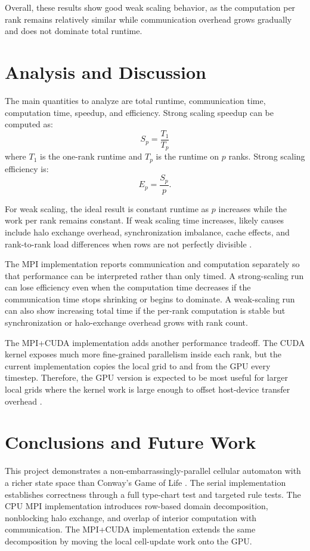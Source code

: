 \documentclass[10pt,twocolumn]{article}
\begin{document}
Overall, these results show good weak scaling behavior, as the computation per rank remains relatively similar while communication overhead grows gradually and does not dominate total runtime.

\FloatBarrier
\section*{Analysis and Discussion}

The main quantities to analyze are total runtime, communication time, computation time, speedup, and efficiency. Strong scaling speedup can be computed as:
\[
S_p = \frac{T_1}{T_p}
\]
where $T_1$ is the one-rank runtime and $T_p$ is the runtime on $p$ ranks. Strong scaling efficiency is:
\[
E_p = \frac{S_p}{p}.
\]

For weak scaling, the ideal result is constant runtime as $p$ increases while the work per rank remains constant. If weak scaling time increases, likely causes include halo exchange overhead, synchronization imbalance, cache effects, and rank-to-rank load differences when rows are not perfectly divisible \cite{halo, stencil}.

The MPI implementation reports communication and computation separately so that performance can be interpreted rather than only timed. A strong-scaling run can lose efficiency even when the computation time decreases if the communication time stops shrinking or begins to dominate. A weak-scaling run can also show increasing total time if the per-rank computation is stable but synchronization or halo-exchange overhead grows with rank count.

The MPI+CUDA implementation adds another performance tradeoff. The CUDA kernel exposes much more fine-grained parallelism inside each rank, but the current implementation copies the local grid to and from the GPU every timestep. Therefore, the GPU version is expected to be most useful for larger local grids where the kernel work is large enough to offset host-device transfer overhead \cite{cuda}.

\FloatBarrier
\section*{Conclusions and Future Work}

This project demonstrates a non-embarrassingly-parallel cellular automaton with a richer state space than Conway's Game of Life \cite{gameoflife}. The serial implementation establishes correctness through a full type-chart test and targeted rule tests. The CPU MPI implementation introduces row-based domain decomposition, nonblocking halo exchange, and overlap of interior computation with communication. The MPI+CUDA implementation extends the same decomposition by moving the local cell-update work onto the GPU.
\end{document}
